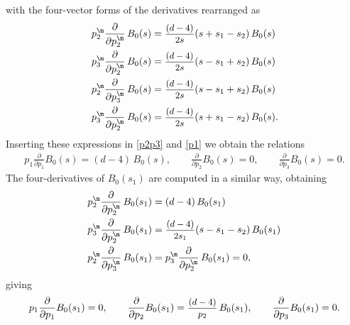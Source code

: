 \documentclass[a4paper,11pt,openright,twoside]{book}
\newcommand{\sdfrac}[2]{\mbox{\small$\displaystyle\frac{#1}{#2}$}}
\numberwithin{equation}{section}
\begin{document}
{{with the four-vector forms of the derivatives rearranged as
\begin{subequations}
	\begin{align}
		p_2^\m\frac{\partial}{\partial p_2^\m}\,B_0(s)&=\sdfrac{( d-4)}{2s}(s+s_1-s_2)\,B_0(s)\\ 
		p_3^\m\frac{\partial}{\partial p_2^\m}\,B_0(s)&=\sdfrac{( d-4)}{2s}(s-s_1+s_2)\,B_0(s)\\
		p_2^\m\frac{\partial}{\partial p_3^\m}\,B_0(s)&=\sdfrac{( d-4)}{2s}(s-s_1+s_2)\,B_0(s)\\
		p_3^\m\frac{\partial}{\partial p_2^\m}\,B_0(s)&=\sdfrac{( d-4)}{2s}(s+s_1-s_2)\,B_0(s).
	\end{align}
\end{subequations}
Inserting these expressions in \eqref{p2p3} and \eqref{p1} we obtain the relations
\begin{subequations}
	\begin{align}
		p_1\frac{\partial}{\partial p_1}B_0(s)=( d-4)\,B_0(s),\qquad\frac{\partial}{\partial p_2}B_0(s)=0,\qquad
		\frac{\partial}{\partial p_3}B_0(s)=0.
	\end{align}
\end{subequations}
The four-derivatives of $B_0(s_1)$ are computed in a similar way, obtaining
\begin{subequations}
	\begin{align}
		p_2^\m\frac{\partial}{\partial p_2^\m}\,B_0(s_1)&=( d-4)\,B_0(s_1)\\
		p_3^\m\frac{\partial}{\partial p_2^\m}\,B_0(s_1)&=\sdfrac{( d-4)}{2s_1}(s-s_1-s_2)\,B_0(s_1)\\
		p_2^\m\frac{\partial}{\partial p_3^\m}\,B_0(s_1)&=p_3^\m\frac{\partial}{\partial p_2^\m}\,B_0(s_1)=0,
	\end{align}
\end{subequations}
giving
\begin{subequations}
	\begin{align}
		p_1\frac{\partial}{\partial p_1}B_0(s_1)=0,\qquad\frac{\partial}{\partial p_2}B_0(s_1)=\sdfrac{( d-4)}{p_2}\,B_0(s_1),\qquad
		\frac{\partial}{\partial p_3}B_0(s_1)=0.
	\end{align}
\end{subequations}

}}
\end{document}
